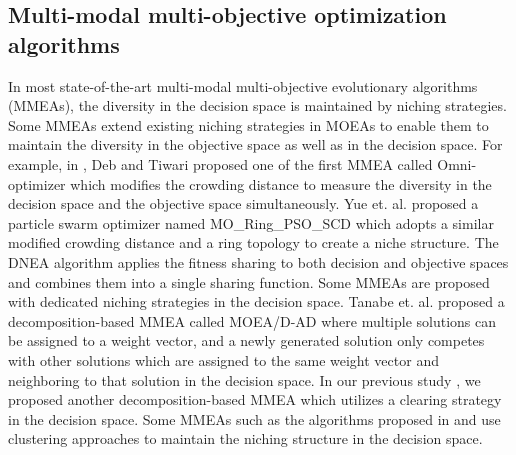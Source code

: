 \subsection{Multi-modal multi-objective optimization algorithms}
\label{sec: Existing multi-modal multi-objective optimization algorithms}
In most state-of-the-art multi-modal multi-objective evolutionary algorithms (MMEAs), the diversity in the decision space is maintained by niching strategies. Some MMEAs extend existing niching strategies in MOEAs to enable them to maintain the diversity in the objective space as well as in the decision space. For example, in \cite{OmniOptimizer}, Deb and Tiwari proposed one of the first MMEA called Omni-optimizer which modifies the crowding distance to measure the diversity in the decision space and the objective space simultaneously. Yue et. al. proposed a particle swarm optimizer named MO\_Ring\_PSO\_SCD \cite{MO_Ring_PSO_SCD} which adopts a similar modified crowding distance and a ring topology to create a niche structure. The DNEA algorithm \cite{DNEA} applies the fitness sharing \cite{Sharing} to both decision and objective spaces and combines them into a single sharing function. Some MMEAs are proposed with dedicated niching strategies in the decision space. Tanabe et. al. proposed a decomposition-based MMEA called MOEA/D-AD\cite{MOEAD_AD} where multiple solutions can be assigned to a weight vector, and a newly generated solution only competes with other solutions which are assigned to the same weight vector and neighboring to that solution in the decision space. In our previous study \cite{MOEAD_MM}, we proposed another decomposition-based MMEA which utilizes a clearing strategy in the decision space. Some MMEAs such as the algorithms proposed in \cite{DBSCAN_MMEA} and \cite{MMOEADC} use clustering approaches to maintain the niching structure in the decision space.